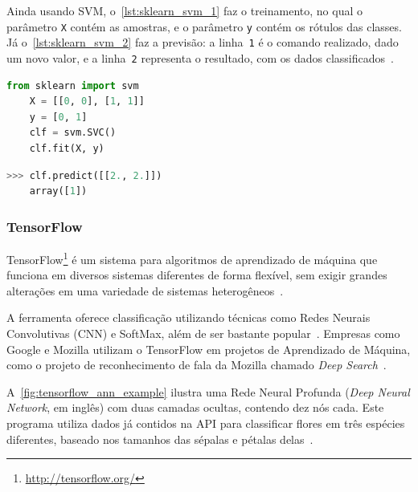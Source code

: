 Ainda usando SVM, o~\autoref{lst:sklearn_svm_1} faz o treinamento, no qual o parâmetro \texttt{X} contém as amostras, e o parâmetro \texttt{y} contém os rótulos das classes. Já o~\autoref{lst:sklearn_svm_2} faz a previsão: a linha~\texttt{1} é o comando realizado, dado um novo valor, e a linha~\texttt{2} representa o resultado, com os dados classificados~\cite{scikitlearn:svm_classif}.

\begin{lstfloat}
\begin{lstlisting}[language=Python,caption={Treino do classificador SVM com scikit-learn},label={lst:sklearn_svm_1}]
	from sklearn import svm
	X = [[0, 0], [1, 1]]
	y = [0, 1]
	clf = svm.SVC()
	clf.fit(X, y)
\end{lstlisting}
\end{lstfloat}

\begin{lstfloat}
\begin{lstlisting}[language=Python,caption={Previsão usando classificador SVM com scikit-learn},label={lst:sklearn_svm_2}]
	>>> clf.predict([[2., 2.]])
	array([1])
\end{lstlisting}
\end{lstfloat}

\subsubsection{TensorFlow}\label{sec:ml_tf}

TensorFlow\footnote{\url{http://tensorflow.org/}} é um sistema para algoritmos de aprendizado de máquina que funciona em diversos sistemas diferentes de forma flexível, sem exigir grandes alterações em uma variedade de sistemas heterogêneos~\cite{abadi:2016}.

A ferramenta oferece classificação utilizando técnicas como Redes Neurais Convolutivas (CNN) e SoftMax, além de ser bastante popular~\cite{ertram:2017}. Empresas como Google e Mozilla utilizam o TensorFlow em projetos de Aprendizado de Máquina, como o projeto de reconhecimento de fala da Mozilla chamado \textit{Deep Search}~\cite{tensorflow:uses}.

A~\autoref{fig:tensorflow_ann_example} ilustra uma Rede Neural Profunda (\textit{Deep Neural Network}, em inglês) com duas camadas ocultas, contendo dez nós cada. Este programa utiliza dados já contidos na API para classificar flores em três espécies diferentes, baseado nos tamanhos das sépalas e pétalas delas~\cite{tensorflow:premade_estimators}.

